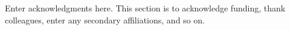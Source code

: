 \documentclass[draft]{agujournal2019}
\begin{document}
\acknowledgments
Enter acknowledgments here. This section is to acknowledge funding, thank colleagues, enter any secondary affiliations, and so on.






%
%
%
%
%
\end{document}
